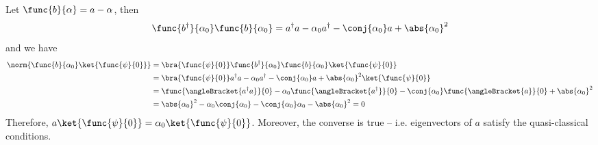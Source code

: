 Let \(\func{b}{\alpha} = a - \alpha\), then 
\begin{equation*}
    \func{b^{\dagger}}{\alpha_0}\func{b}{\alpha_0} = a^{\dagger}a - \alpha_0 a^{\dagger} - \conj{\alpha_0} a + \abs{\alpha_0}^2
\end{equation*}
and we have 
\begin{align*}
    \norm{\func{b}{\alpha_0} \ket{\func{\psi}{0}}} &= \bra{\func{\psi}{0}} \func{b^{\dagger}}{\alpha_0}\func{b}{\alpha_0} \ket{\func{\psi}{0}}\\
    &= \bra{\func{\psi}{0}} a^{\dagger}a - \alpha_0 a^{\dagger} - \conj{\alpha_0} a + \abs{\alpha_0}^2 \ket{\func{\psi}{0}}\\
    &= \func{\angleBracket{a^{\dagger}a}}{0} - \alpha_0 \func{\angleBracket{a^{\dagger}}}{0} - \conj{\alpha_0} \func{\angleBracket{a}}{0} + \abs{\alpha_0}^2\\
    &= \abs{\alpha_0}^2 - \alpha_0 \conj{\alpha_0} - \conj{\alpha_0} \alpha_0 - \abs{\alpha_0}^2 = 0
\end{align*}
Therefore, \(a \ket{\func{\psi}{0}} = \alpha_0 \ket{\func{\psi}{0}}\). Moreover, the converse is true -- i.e. eigenvectors of \(a\) satisfy the quasi-classical conditions. 

